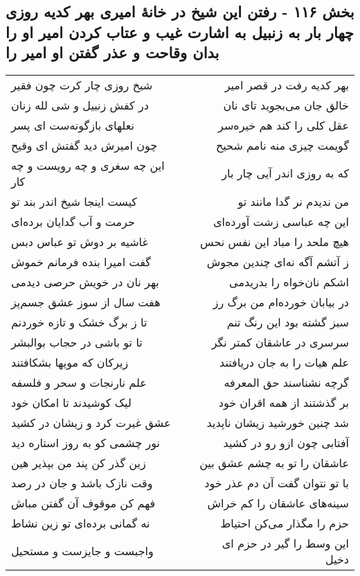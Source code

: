 \begin{center}
\section*{بخش ۱۱۶ - رفتن این شیخ در خانهٔ امیری بهر کدیه روزی چهار بار به زنبیل به اشارت غیب و عتاب کردن امیر او را بدان وقاحت و عذر  گفتن او امیر را}
\label{sec:sh116}
\begin{longtable}{l p{0.5cm} r}
شیخ روزی چار کرت چون فقیر
&&
بهر کدیه رفت در قصر امیر
\\
در کفش زنبیل و شی لله زنان
&&
خالق جان می‌بجوید تای نان
\\
نعلهای بازگونه‌ست ای پسر
&&
عقل کلی را کند هم خیره‌سر
\\
چون امیرش دید گفتش ای وقیح
&&
گویمت چیزی منه نامم شحیح
\\
این چه سغری و چه رویست و چه کار
&&
که به روزی اندر آیی چار بار
\\
کیست اینجا شیخ اندر بند تو
&&
من ندیدم نر گدا مانند تو
\\
حرمت و آب گدایان برده‌ای
&&
این چه عباسی زشت آورده‌ای
\\
غاشیه بر دوش تو عباس دبس
&&
هیچ ملحد را مباد این نفس نحس
\\
گفت امیرا بنده فرمانم خموش
&&
ز آتشم آگه نه‌ای چندین مجوش
\\
بهر نان در خویش حرصی دیدمی
&&
اشکم نان‌خواه را بدریدمی
\\
هفت سال از سوز عشق جسم‌پز
&&
در بیابان خورده‌ام من برگ رز
\\
تا ز برگ خشک و تازه خوردنم
&&
سبز گشته بود این رنگ تنم
\\
تا تو باشی در حجاب بوالبشر
&&
سرسری در عاشقان کمتر نگر
\\
زیرکان که مویها بشکافتند
&&
علم هیات را به جان دریافتند
\\
علم نارنجات و سحر و فلسفه
&&
گرچه نشناسند حق المعرفه
\\
لیک کوشیدند تا امکان خود
&&
بر گذشتند از همه اقران خود
\\
عشق غیرت کرد و زیشان در کشید
&&
شد چنین خورشید زیشان ناپدید
\\
نور چشمی کو به روز استاره دید
&&
آفتابی چون ازو رو در کشید
\\
زین گذر کن پند من بپذیر هین
&&
عاشقان را تو به چشم عشق بین
\\
وقت نازک باشد و جان در رصد
&&
با تو نتوان گفت آن دم عذر خود
\\
فهم کن موقوف آن گفتن مباش
&&
سینه‌های عاشقان را کم خراش
\\
نه گمانی برده‌ای تو زین نشاط
&&
حزم را مگذار می‌کن احتیاط
\\
واجبست و جایزست و مستحیل
&&
این وسط را گیر در حزم ای دخیل
\\
\end{longtable}
\end{center}
